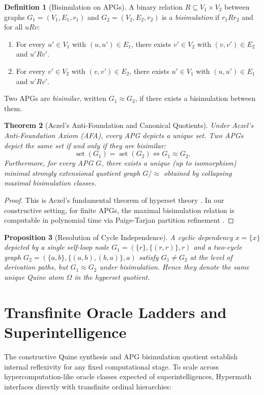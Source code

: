 \documentclass[11pt]{article}
\newtheorem{theorem}{Theorem}[section]
\newtheorem{proposition}[theorem]{Proposition}
\theoremstyle{definition}
\newtheorem{definition}[theorem]{Definition}
\begin{document}
\begin{definition}[Bisimulation on APGs]
A binary relation $R \subseteq V_1 \times V_2$ between graphs $G_1 = (V_1, E_1, r_1)$ and $G_2 = (V_2, E_2, r_2)$ is a \emph{bisimulation} if $r_1 R r_2$ and for all $u R v$:
\begin{enumerate}
\item For every $u' \in V_1$ with $(u, u') \in E_1$, there exists $v' \in V_2$ with $(v, v') \in E_2$ and $u' R v'$.
\item For every $v' \in V_2$ with $(v, v') \in E_2$, there exists $u' \in V_1$ with $(u, u') \in E_1$ and $u' R v'$.
\end{enumerate}
Two APGs are \emph{bisimilar}, written $G_1 \approx G_2$, if there exists a bisimulation between them.
\end{definition}

\begin{theorem}[Aczel's Anti-Foundation and Canonical Quotients]
Under Aczel's Anti-Foundation Axiom (AFA), every APG depicts a unique set. Two APGs depict the same set if and only if they are bisimilar:
\[
\operatorname{set}(G_1) = \operatorname{set}(G_2) \iff G_1 \approx G_2.
\]
Furthermore, for every APG $G$, there exists a unique (up to isomorphism) minimal strongly extensional quotient graph $G / \approx$ obtained by collapsing maximal bisimulation classes.
\end{theorem}
\begin{proof}
This is Aczel's fundamental theorem of hyperset theory \cite{aczel}. In our constructive setting, for finite APGs, the maximal bisimulation relation is computable in polynomial time via Paige-Tarjan partition refinement \cite{paige_tarjan}.
\end{proof}

\begin{proposition}[Resolution of Cycle Independence]
A cyclic dependency $x = \{x\}$ depicted by a single self-loop node $G_1 = (\{r\}, \{(r, r)\}, r)$ and a two-cycle graph $G_2 = (\{a, b\}, \{(a, b), (b, a)\}, a)$ satisfy $G_1 \ne G_2$ at the level of derivation paths, but $G_1 \approx G_2$ under bisimulation. Hence they denote the same unique Quine atom $\Omega$ in the hyperset quotient.
\end{proposition}

\section{Transfinite Oracle Ladders and Superintelligence}
The constructive Quine synthesis and APG bisimulation quotient establish internal reflexivity for any fixed computational stage. To scale across hypercomputation-like oracle classes expected of superintelligences, Hypermath interfaces directly with transfinite ordinal hierarchies:
\end{document}
